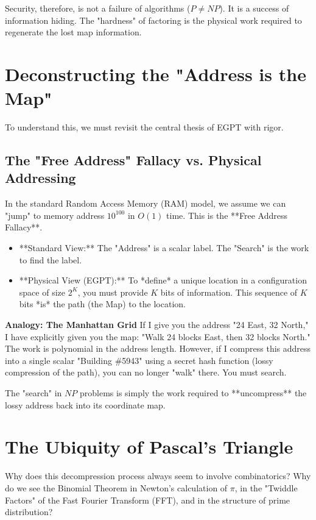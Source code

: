 \documentclass[11pt, a4paper]{article}
\begin{document}
Security, therefore, is not a failure of algorithms ($P \neq NP$). It is a success of information hiding. The "hardness" of factoring is the physical work required to regenerate the lost map information.

\section{Deconstructing the "Address is the Map"}

To understand this, we must revisit the central thesis of EGPT with rigor.

\subsection{The "Free Address" Fallacy vs. Physical Addressing}
In the standard Random Access Memory (RAM) model, we assume we can "jump" to memory address $10^{100}$ in $O(1)$ time. This is the **Free Address Fallacy**.
\begin{itemize}
    \item **Standard View:** The "Address" is a scalar label. The "Search" is the work to find the label.
    \item **Physical View (EGPT):** To *define* a unique location in a configuration space of size $2^K$, you must provide $K$ bits of information. This sequence of $K$ bits *is* the path (the Map) to the location.
\end{itemize}

\textbf{Analogy: The Manhattan Grid}
If I give you the address "24 East, 32 North," I have explicitly given you the map: "Walk 24 blocks East, then 32 blocks North." The work is polynomial in the address length.
However, if I compress this address into a single scalar "Building \#5943" using a secret hash function (lossy compression of the path), you can no longer "walk" there. You must search.

The "search" in $NP$ problems is simply the work required to **uncompress** the lossy address back into its coordinate map.

\section{The Ubiquity of Pascal's Triangle}

Why does this decompression process always seem to involve combinatorics? Why do we see the Binomial Theorem in Newton's calculation of $\pi$, in the "Twiddle Factors" of the Fast Fourier Transform (FFT), and in the structure of prime distribution?
\end{document}
